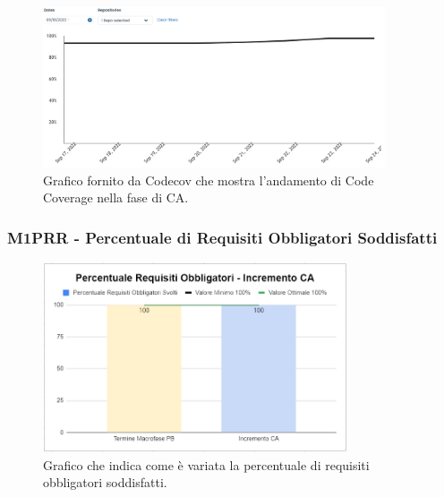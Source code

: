 \begin{figure}[H]
  \centering\includegraphics[width=0.9\textwidth, height=0.9\textheight,keepaspectratio]{images/CA-CodeCov.png}
   \caption{Grafico fornito da Codecov che mostra l'andamento di Code Coverage nella fase di CA.}
\end{figure}  

\subsubsection{M1PRR - Percentuale di Requisiti Obbligatori Soddisfatti}
\begin{figure}[H]
   \centering\includegraphics[width=0.8\textwidth, height=0.8\textheight,keepaspectratio]{images/CA-Requisiti-Obbligatori-Soddisfatti.png}
    \caption{Grafico che indica come è variata la percentuale di requisiti obbligatori soddisfatti.}
\end{figure}  
 
